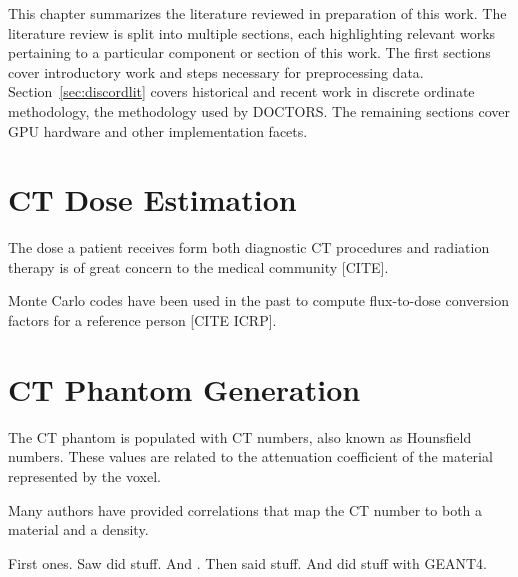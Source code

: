 


This chapter summarizes the literature reviewed in preparation of this work. The literature review is split into multiple sections, each highlighting relevant works pertaining to a particular component or section of this work. The first sections cover introductory work and steps necessary for preprocessing data. Section~\ref{sec:discordlit} covers historical and recent work in discrete ordinate methodology, the methodology used by DOCTORS. The remaining sections cover GPU hardware and other implementation facets.

\section{CT Dose Estimation}
The dose a patient receives form both diagnostic CT procedures and radiation therapy is of great concern to the medical community [CITE]. 

Monte Carlo codes have been used in the past to compute flux-to-dose conversion factors for a reference person [CITE ICRP].

\section{CT Phantom Generation}
The CT phantom is populated with CT numbers, also known as Hounsfield numbers. These values are related to the attenuation coefficient of the material represented by the voxel.

Many authors have provided correlations that map the CT number to both a material and a density.

First ones.
Saw \citep{ref:sawc} did stuff. And \citep{ref:plessisf}. Then \citet{ref:schneideru} said stuff. And \citet{ref:kimh} did stuff with GEANT4.

